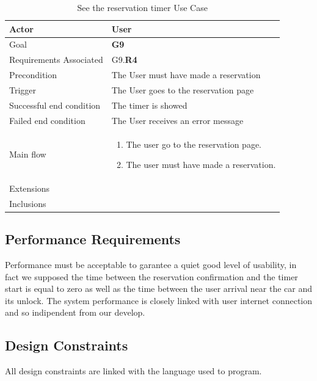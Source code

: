 \newline
\begin{table}[htb]
\begin{center}
\renewcommand{\arraystretch}{1.5}
\begin{tabular}{|l|p{}|}
\hline
Actor & User \\ \hline
Goal & \textbf{G9} \\ \hline
Requirements Associated & G9.\textbf{R4} \\ \hline
Precondition & The User must have made a reservation \\ \hline
Trigger & The User goes to the reservation page \\ \hline
Successful end condition & The timer is showed \\ \hline
Failed end condition & The User receives an error message \\ \hline
Main flow & \begin{minipage}[t]{0.6\textwidth}
\begin{enumerate}
\addtolength{\itemindent}{0.5cm}
\item The user go to the reservation page.
\item The user must have made a reservation. 
\end{enumerate}
\end{minipage} \\ \hline
Extensions & \\ \hline
Inclusions & \\ \hline
\end{tabular}
\caption{ See the reservation timer Use Case}
\end{center}
\end{table}
\clearpage


\subsection{Performance Requirements} \label{sec:perf_requirements}
Performance must be acceptable to garantee a quiet good level of usability, in fact we supposed the time between the reservation confirmation and the timer start is equal to zero as well as the time between the user arrival near the car and its unlock. The system performance is closely linked with user internet connection and so indipendent from our develop.

\subsection{Design Constraints} \label{sec:design_constr}
All design constraints are linked with the language used to program.

